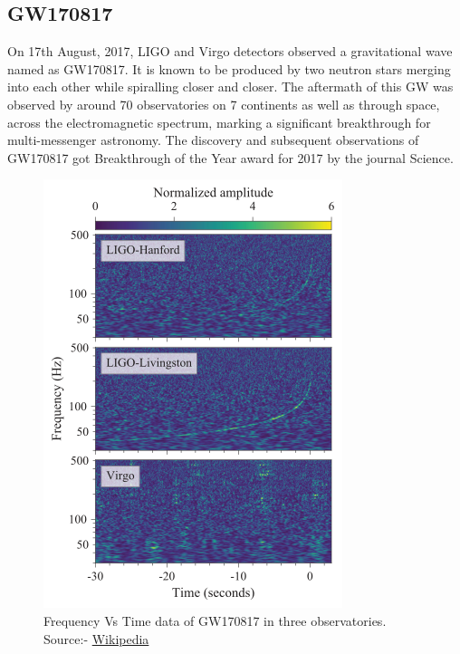 \pagebreak

\subsection{GW170817}

On 17th August, 2017, LIGO and Virgo detectors observed a gravitational wave named as GW170817. It is known to be produced by two neutron stars merging into each other while spiralling closer and closer. The aftermath of this GW was observed by around 70 observatories on 7 continents as well as through space, across the electromagnetic spectrum, marking a significant breakthrough for multi-messenger astronomy. The discovery and subsequent observations of GW170817 got Breakthrough of the Year award for 2017 by the journal Science.

\begin{figure}[h]
    \centering
    \includegraphics[scale=0.78]{images.tex/GW170817_observatories.png}
    \caption{Frequency Vs Time data of GW170817 in three observatories. Source:- \href{https://en.wikipedia.org/wiki/GW170817}{Wikipedia}}
\end{figure}

